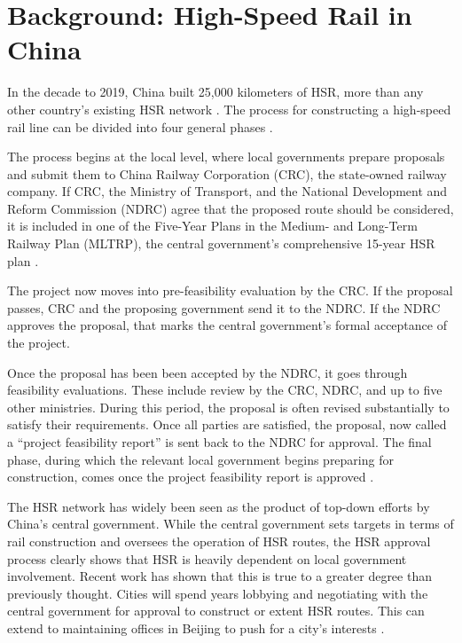 \documentclass[12pt, ]{article}
\begin{document}
\hypertarget{background-high-speed-rail-in-china}{%
\section{Background: High-Speed Rail in
China}\label{background-high-speed-rail-in-china}}

In the decade to 2019, China built 25,000 kilometers of HSR, more than
any other country's existing HSR network \citep{lawrence_chinas_2019}.
The process for constructing a high-speed rail line can be divided into
four general phases \citep{ma_localized_2022}.

The process begins at the local level, where local governments prepare
proposals and submit them to China Railway Corporation (CRC), the
state-owned railway company. If CRC, the Ministry of Transport, and the
National Development and Reform Commission (NDRC) agree that the
proposed route should be considered, it is included in one of the
Five-Year Plans in the Medium- and Long-Term Railway Plan (MLTRP), the
central government's comprehensive 15-year HSR plan
\citep{ma_localized_2022, lawrence_chinas_2019}.

The project now moves into pre-feasibility evaluation by the CRC. If the
proposal passes, CRC and the proposing government send it to the NDRC.
If the NDRC approves the proposal, that marks the central government's
formal acceptance of the project.

Once the proposal has been been accepted by the NDRC, it goes through
feasibility evaluations. These include review by the CRC, NDRC, and up
to five other ministries. During this period, the proposal is often
revised substantially to satisfy their requirements. Once all parties
are satisfied, the proposal, now called a ``project feasibility report''
is sent back to the NDRC for approval. The final phase, during which the
relevant local government begins preparing for construction, comes once
the project feasibility report is approved \citep{ma_localized_2022}.

The HSR network has widely been seen as the product of top-down efforts
by China's central government. While the central government sets targets
in terms of rail construction and oversees the operation of HSR routes,
the HSR approval process clearly shows that HSR is heavily dependent on
local government involvement. Recent work has shown that this is true to
a greater degree than previously thought. Cities will spend years
lobbying and negotiating with the central government for approval to
construct or extent HSR routes. This can extend to maintaining offices
in Beijing to push for a city's interests
\citep{ma_localized_2022, ji_revolutionaries_2022}.
\end{document}
